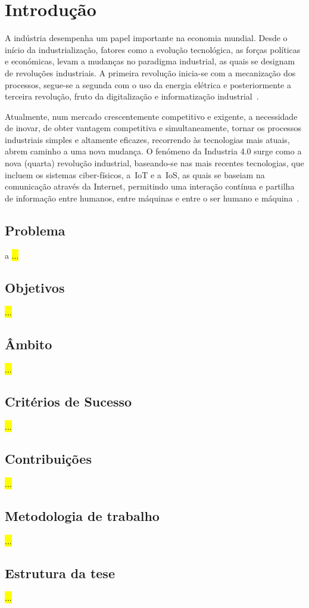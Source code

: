 \chapter{Introdução}
\label{chap:chapter1}

A indústria desempenha um papel importante na economia mundial. Desde o início da industrialização, fatores como a evolução tecnológica, as forças políticas e económicas, levam a mudanças no paradigma industrial, as quais se designam de revoluções industriais. A primeira revolução inicia-se com a mecanização dos processos, segue-se a segunda com o uso da energia elétrica e posteriormente a terceira revolução, fruto da digitalização e informatização industrial~\parencite{industry40, the_modern_industrial_revolution_exit_failure_internal_control_systems}.

Atualmente, num mercado crescentemente competitivo e exigente, a necessidade de inovar, de obter vantagem competitiva e simultaneamente, tornar os processos industriais simples e altamente eficazes, recorrendo às tecnologias mais atuais, abrem caminho a uma nova mudança. O fenómeno da Industria 4.0 surge como a nova (quarta) revolução industrial, baseando-se nas mais recentes tecnologias, que incluem os sistemas ciber-físicos, a~\gls{IoT} e a~\gls{IoS}, as quais se baseiam na comunicação através da Internet, permitindo uma interação contínua e partilha de informação entre humanos, entre máquinas e entre o ser humano e máquina~\parencite{complex_view_industry40}. 


\section{Problema} 
\label{sec:ch1_problem}
a
\hl{...}

\section{Objetivos}
\label{sec:ch1_objectives}

\hl{...}


\section{Âmbito}
\label{sec:ch1_scope}

\hl{...}



\section{Critérios de Sucesso}
\label{sec:ch1_success_criteria}

\hl{...}


\section{Contribuições}
\label{sec:ch1_contribuitions}

\hl{...}


\section{Metodologia de trabalho}
\label{sec:ch1_methodology}

\hl{...}


\section{Estrutura da tese}
\label{sec:ch1_structure}

\hl{...}
